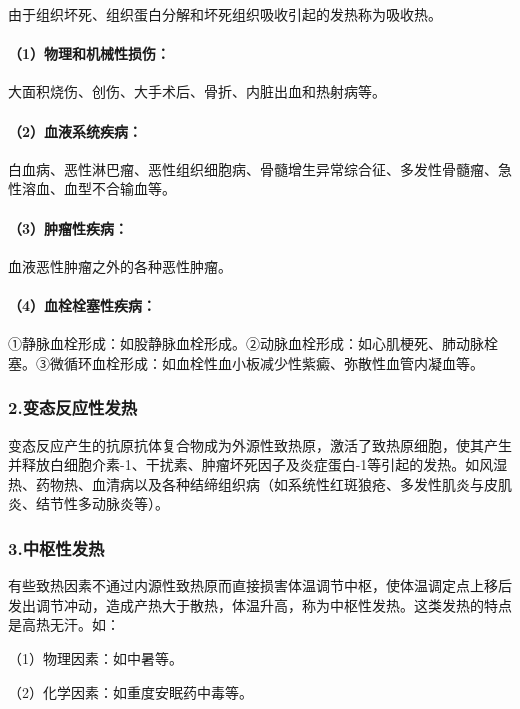 由于组织坏死、组织蛋白分解和坏死组织吸收引起的发热称为吸收热。

\paragraph{（1）物理和机械性损伤：}

大面积烧伤、创伤、大手术后、骨折、内脏出血和热射病等。

\paragraph{（2）血液系统疾病：}

白血病、恶性淋巴瘤、恶性组织细胞病、骨髓增生异常综合征、多发性骨髓瘤、急性溶血、血型不合输血等。

\paragraph{（3）肿瘤性疾病：}

血液恶性肿瘤之外的各种恶性肿瘤。

\paragraph{（4）血栓栓塞性疾病：}

①静脉血栓形成：如股静脉血栓形成。②动脉血栓形成：如心肌梗死、肺动脉栓塞。③微循环血栓形成：如血栓性血小板减少性紫癜、弥散性血管内凝血等。

\subsubsection{2.变态反应性发热}

变态反应产生的抗原抗体复合物成为外源性致热原，激活了致热原细胞，使其产生并释放白细胞介素-1、干扰素、肿瘤坏死因子及炎症蛋白-1等引起的发热。如风湿热、药物热、血清病以及各种结缔组织病（如系统性红斑狼疮、多发性肌炎与皮肌炎、结节性多动脉炎等）。

\subsubsection{3.中枢性发热}

有些致热因素不通过内源性致热原而直接损害体温调节中枢，使体温调定点上移后发出调节冲动，造成产热大于散热，体温升高，称为中枢性发热。这类发热的特点是高热无汗。如：

（1）物理因素：如中暑等。

（2）化学因素：如重度安眠药中毒等。

